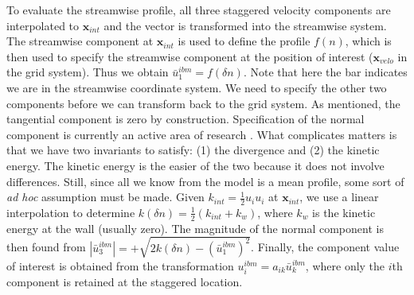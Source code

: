 \documentclass[12pt]{article}
\begin{document}
To evaluate the streamwise profile, all three staggered velocity components are interpolated to $\mathbf{x}_{int}$ and the vector is transformed into the streamwise system.  The streamwise component at $\mathbf{x}_{int}$ is used to define the profile $f(n)$, which is then used to specify the streamwise component at the position of interest ($\mathbf{x}_{velo}$ in the grid system).  Thus we obtain $\bar{u}_1^{ibm} = f(\delta n)$.  Note that here the bar indicates we are in the streamwise coordinate system.  We need to specify the other two components before we can transform back to the grid system.  As mentioned, the tangential component is zero by construction. Specification of the normal component is currently an active area of research \cite{Choi:2007}.  What complicates matters is that we have two invariants to satisfy: (1) the divergence and (2) the kinetic energy. The kinetic energy is the easier of the two because it does not involve differences.  Still, since all we know from the model is a mean profile, some sort of \emph{ad hoc} assumption must be made.  Given $k_{int}=\frac{1}{2}u_i u_i$ at $\mathbf{x}_{int}$, we use a linear interpolation to determine $k(\delta n) = \frac{1}{2}(k_{int} + k_w)$, where $k_w$ is the kinetic energy at the wall (usually zero).  The magnitude of the normal component is then found from $|\bar{u}_3^{ibm}| = +\sqrt{2k(\delta n) - (\bar{u}_1^{ibm})^2}$.  Finally, the component value of interest is obtained from the transformation $u_i^{ibm} = a_{ik} \bar{u}_k^{ibm}$, where only the $i$th component is retained at the staggered location.
\end{document}
